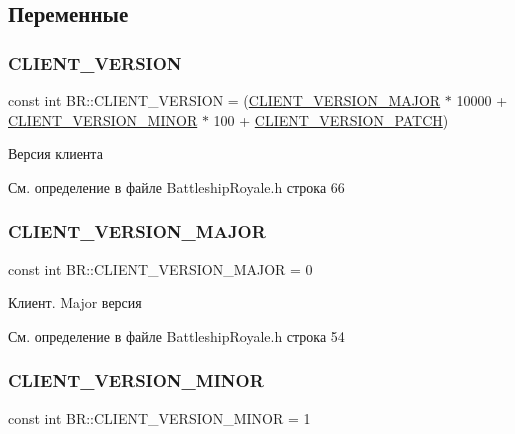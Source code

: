 \subsection{Переменные}
\mbox{\label{namespace_b_r_a5efdcacd78568f72acf52924873804a3}} 
\subsubsection{\texorpdfstring{CLIENT\_VERSION}{CLIENT\_VERSION}}
{\footnotesize\ttfamily const int B\+R\+::\+C\+L\+I\+E\+N\+T\+\_\+\+V\+E\+R\+S\+I\+ON = (\mbox{\hyperlink{namespace_b_r_a99a147d6069c07f03a2baf3bb531e308}{C\+L\+I\+E\+N\+T\+\_\+\+V\+E\+R\+S\+I\+O\+N\+\_\+\+M\+A\+J\+OR}} $\ast$ 10000 + \mbox{\hyperlink{namespace_b_r_a4182b988c7afdd13d1e00d1a558c44ab}{C\+L\+I\+E\+N\+T\+\_\+\+V\+E\+R\+S\+I\+O\+N\+\_\+\+M\+I\+N\+OR}} $\ast$ 100 + \mbox{\hyperlink{namespace_b_r_a35ec7e796e49c1a6b87e73c07d643378}{C\+L\+I\+E\+N\+T\+\_\+\+V\+E\+R\+S\+I\+O\+N\+\_\+\+P\+A\+T\+CH}})}



Версия клиента 



См. определение в файле Battleship\+Royale.\+h строка 66

\mbox{\label{namespace_b_r_a99a147d6069c07f03a2baf3bb531e308}} 
\subsubsection{\texorpdfstring{CLIENT\_VERSION\_MAJOR}{CLIENT\_VERSION\_MAJOR}}
{\footnotesize\ttfamily const int B\+R\+::\+C\+L\+I\+E\+N\+T\+\_\+\+V\+E\+R\+S\+I\+O\+N\+\_\+\+M\+A\+J\+OR = 0}



Клиент. Major версия 



См. определение в файле Battleship\+Royale.\+h строка 54

\mbox{\label{namespace_b_r_a4182b988c7afdd13d1e00d1a558c44ab}} 
\subsubsection{\texorpdfstring{CLIENT\_VERSION\_MINOR}{CLIENT\_VERSION\_MINOR}}
{\footnotesize\ttfamily const int B\+R\+::\+C\+L\+I\+E\+N\+T\+\_\+\+V\+E\+R\+S\+I\+O\+N\+\_\+\+M\+I\+N\+OR = 1}



